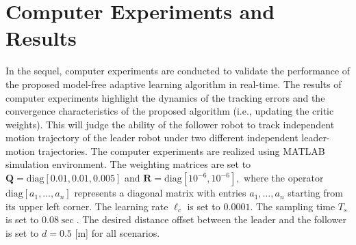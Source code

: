 \documentclass[letterpaper]{article} %
\begin{document}
\section{Computer Experiments and Results}
\label{sec:resultsExperiments}
In the sequel, computer experiments  are conducted to validate the performance of the proposed model-free adaptive learning algorithm in real-time. The results of computer experiments highlight the dynamics of the tracking errors and the convergence characteristics of the proposed algorithm (i.e., updating the critic weights). This will judge the ability of the follower robot to track independent motion trajectory of the leader robot under two different independent leader-motion trajectories. The computer experiments are realized using MATLAB simulation environment. The weighting matrices are set to $\mathbf{Q} = \mathrm{diag}[0.01,0.01,0.005]$ and $\mathbf{R} = \mathrm{diag}[10^{-6}, 10^{-6}],$ where the operator $\mathrm{diag}[a_1,\ldots,a_n]$ represents a diagonal matrix with entries $a_1,\ldots,a_n$ starting from its upper left corner. %
The learning rate $\ell_c$ is set to  $0.0001$. The sampling time $T_s$ is set to $0.08 \sec.$ The desired distance offset between the leader and the follower is set to $ d = 0.5$ [m] for all scenarios.
\end{document}
